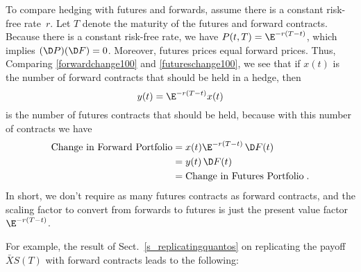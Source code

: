 To compare hedging with futures and forwards, assume  there is a constant risk-free rate~$r$.  Let $T$ denote the maturity of the futures and forward contracts.  Because there is a constant risk-free rate, we have $P(t,T) = \E^{-r(T-t)}$, which implies $(\D P)(\D F) =0$.  Moreover, futures prices equal forward prices.  Thus,
Comparing \eqref{forwardchange100} and \eqref{futureschange100}, we see that if $x(t)$ is the number of forward contracts that should be held in a hedge, then 
\begin{equation}\label{futuresxy}
y(t) = \E^{-r(T-t)}x(t)
\end{equation}
is the number of futures contracts that should be held, because with this number of contracts we have
\begin{align*}
\text{Change in Forward Portfolio} & = x(t)\E^{-r(T-t)}\,\D F(t)\\
& = y(t)\,\D F(t)\\
& = \text{Change in Futures Portfolio}\;.
\end{align*}
In short, we don't require as many futures contracts as forward contracts, and the scaling factor to convert from forwards to futures is just the present value factor $\E^{-r(T-t)}$.

For example, the result of Sect.~\ref{s_replicatingquantos} on replicating the payoff $\bar{X}S(T)$ with forward contracts leads to the following:

